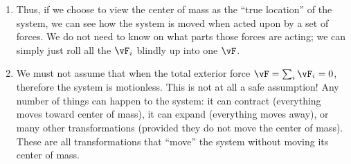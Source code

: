 \begin{enumerate}
  \item Thus, if we choose to view the center of mass as the ``true
  location'' of the system, we can see how the system is moved when
  acted upon by a set of forces. We do not need to know on what parts
  those forces are acting; we can simply just roll all the $\vF_i$
  blindly up into one $\vF$.

  \item We must not assume that when the total exterior force $\vF =
  \sum_i \vF_i = 0$, therefore the system is motionless. This is not at
  all a safe assumption! Any number of things can happen to the system:
  it can contract (everything moves toward center of mass), it can
  expand (everything moves away), or many other transformations
  (provided they do not move the center of mass). These are all
  transformations that ``move'' the system without moving its center of
  mass.
\end{enumerate}
